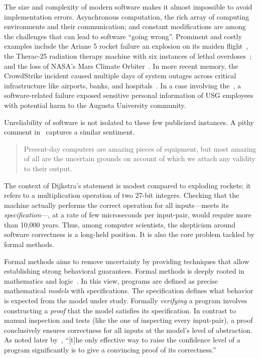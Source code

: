 The size and complexity of modern software makes it almost impossible to avoid implementation errors.
Asynchronous computation, the rich array of computing environments and their communication;
and constant modifications are among the challenges that can lead to software \enquote{going wrong}.
Prominent and costly examples include
the Ariane 5 rocket failure an explosion on its maiden flight~\cite{ariane5},
the Therac-25 radiation therapy machine with six instances of lethal overdoses~\cite{leveson1993};
and the loss of NASA's Mars Climate Orbiter~\cite{mars1999}.
In more recent memory, the CrowdStrike incident caused multiple days of system outages
 across critical infrastructure like airports, banks, and hospitals~\cite{crowdstrike}.
In a case involving the~\textcite{usg2024},
a software-related failure exposed sensitive personal information of USG employees with potential harm to the Augusta University community.

Unreliability of software is not isolated to these few publicized instances.
A pithy comment in~\textcite[p. 3]{dijkstra1970} captures a similar sentiment.

\begin{quotation}
\noindent{}Present-day computers are amazing pieces of equipment,
but most amazing of all are the uncertain grounds on account of which we attach any validity to their output.
\end{quotation}

The context of Dijkstra's statement is modest compared to exploding rockets;
it refers to a multiplication operation of two 27-bit integers.
Checking that the machine actually performs the correct operation for all inputs---\ie meets its \emph{specification}---,
at a rate of few microseconds per input-pair, would require more than 10,000 years.
Thus, among computer scientists, the skepticism around software correctness is a long-held position.
It is also the core problem tackled by formal methods.

Formal methods aims to remove uncertainty by providing techniques that allow establishing strong behavioral guarantees.
Formal methods is deeply rooted in mathematics and logic~\cite{shankar2023}.
In this view, programs are defined as precise mathematical \emph{models} with {specifications}.
The specification defines what behavior is expected from the model under study.
Formally \emph{verifying} a program involves constructing a \emph{proof} that the model satisfies its specification.
In contrast to manual inspection and tests (like the one of inspecting every input-pair),
a proof conclusively ensures correctness for all inputs at the model's level of abstraction.
As noted later by~\textcite{dijkstra1972}, \enquote{{[t]he only effective way to raise the confidence level of a program significantly is to give a convincing proof of its correctness.}}

